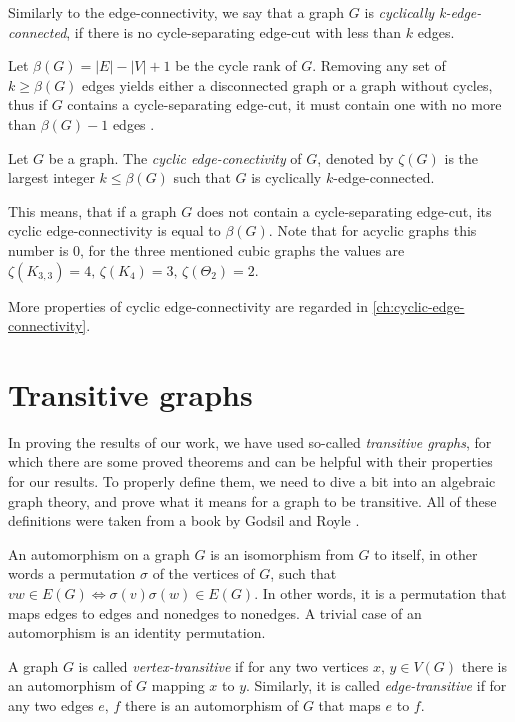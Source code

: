 \documentclass[12pt, twoside]{book}
\begin{document}
Similarly to the edge-connectivity, we say that a graph $G$ is \textit{cyclically k-edge-connected}, if there is no cycle-separating edge-cut with less than $k$ edges.

Let $\beta(G)=|E|-|V|+1$ be the cycle rank of $G$. Removing any set of $k\geq \beta(G)$ edges yields either a disconnected graph or a graph without cycles, thus if $G$ contains a cycle-separating edge-cut, it must contain one with no more than $\beta(G)-1$ edges \cite{atoms-of-cyclic}.

\begin{definition}
	Let $G$ be a graph. The \textit{cyclic edge-conectivity} of $G$, denoted by $\zeta(G)$ is the largest integer $k \leq \beta(G)$ such that $G$ is cyclically $k$-edge-connected.
\end{definition}

This means, that if a graph $G$ does not contain a cycle-separating edge-cut, its cyclic edge-connectivity is equal to $\beta(G)$. Note that for acyclic graphs this number is 0, for the three mentioned cubic graphs the values are $\zeta(K_{3,3})=4,\, \zeta(K_4)=3,\, \zeta(\Theta_2)=2$.

More properties of cyclic edge-connectivity are regarded in \cref{ch:cyclic-edge-connectivity}.

\section{Transitive graphs}

In proving the results of our work, we have used so-called \textit{transitive graphs}, for which there are some proved theorems and can be helpful with their properties for our results. To properly define them, we need to dive a bit into an algebraic graph theory, and prove what it means for a graph to be transitive. All of these definitions were taken from a book by Godsil and Royle \cite{algebraic-graph-theory}.

An automorphism on a graph $G$ is an isomorphism from $G$ to itself, in other words a permutation $\sigma$ of the vertices of $G$, such that $vw\in E(G)\Leftrightarrow \sigma(v)\sigma(w)\in E(G)$. In other words, it is a permutation that maps edges to edges and nonedges to nonedges. A trivial case of an automorphism is an identity permutation.

A graph $G$ is called \emph{vertex-transitive} if for any two vertices $x,\,y\in V(G)$ there is an automorphism of $G$ mapping $x$ to $y$. Similarly, it is called \emph{edge-transitive} if for any two edges $e,\,f$ there is an automorphism of $G$ that maps $e$ to $f$.
\end{document}
